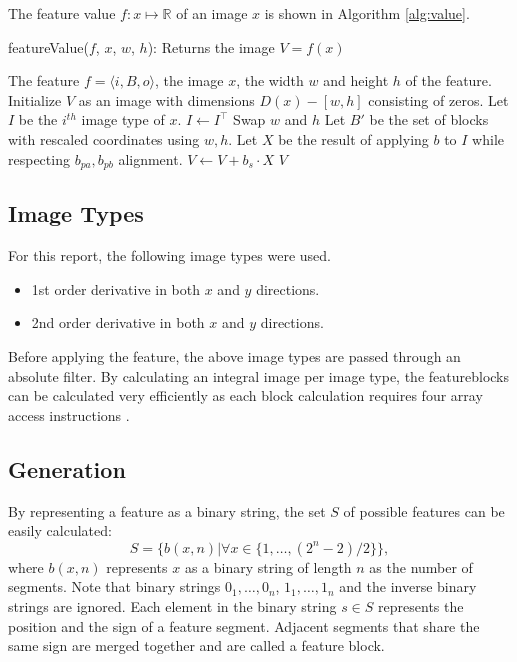 \documentclass[a4paper,11pt]{article}
\begin{document}
The feature value $f:x\mapsto\mathbb{R}$ of an image $x$ is shown in Algorithm
\ref{alg:value}.
\begin{algorithm}[!htb]
	\caption{featureValue($f$, $x$, $w$, $h$): Returns the image $V = f(x)$}
	\begin{algorithmic}[1]
	\REQUIRE The feature $f = \langle i, B, o \rangle$, the image $x$, the width $w$ and height $h$ of the feature.
	\medskip
	\STATE Initialize $V$ as an image with dimensions $D(x)-[w, h]$ consisting of zeros.
	\STATE Let $I$ be the $i^{th}$ image type of $x$.
		\STATE $I \leftarrow I^\top$
		\STATE Swap $w$ and $h$
	\ENDIF
	\STATE Let $B'$ be the set of blocks with rescaled coordinates using $w,h$.
		\STATE Let $X$ be the result of applying $b$ to $I$ while respecting $b_{pa}, b_{pb}$ alignment.
		\STATE $V \leftarrow V + b_s \cdot X$
	\ENDFOR
	\RETURN $V$
	\end{algorithmic}
\label{alg:value}
\end{algorithm}

\newpage
\subsection{Image Types} \label{sec:image}
For this report, the following image types were used.
\begin{itemize}
	\item{1st order derivative in both $x$ and $y$ directions.}
	\item{2nd order derivative in both $x$ and $y$ directions.}
\end{itemize}
Before applying the feature, the above image types are passed through an
absolute filter. By calculating an integral image per image type, the
featureblocks can be calculated very efficiently as each block calculation
requires four array access instructions \cite{viola}.

\subsection{Generation} \label{sec:gen}
By representing a feature as a binary string, the set $S$ of possible features
can be easily calculated:
$$S = \{b(x,n) | \forall x \in \{1,\ldots,(2^n-2)/2\}\},$$
where $b(x,n)$ represents $x$ as a binary string of length $n$ as the number of
segments. Note that binary strings $0_1,\ldots,0_n$, $1_1,\ldots,1_n$ and the
inverse binary strings are ignored. Each element in the binary string $s \in S$
represents the position and the sign of a feature segment. Adjacent segments
that share the same sign are merged together and are called a feature block.\\
\end{document}
